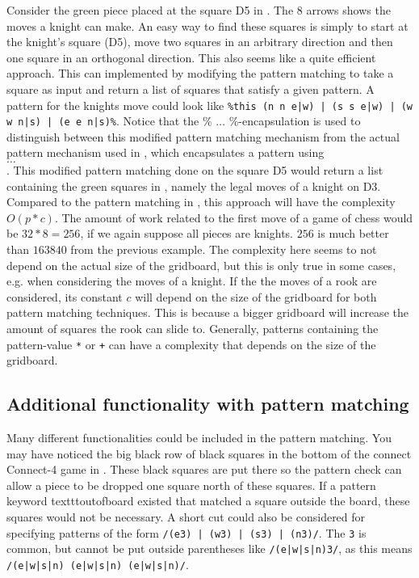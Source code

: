 Consider the green piece placed at the square D5 in . The 8 arrows shows the moves a knight can make. An easy way to find these squares is simply to start at the knight's square (D5), move two squares in an arbitrary direction and then one square in an orthogonal direction. This also seems like a quite efficient approach. This can implemented by modifying the pattern matching to take a square as input and return a list of squares that satisfy a given pattern. A pattern for the knights move could look like \texttt{\%this (n n e|w) | (s s e|w) | (w w n|s) | (e e n|s)\%}. Notice that the \% $\ldots$ \%-encapsulation is used to distinguish between this modified pattern matching mechanism from the actual pattern mechanism used in \productname{}, which encapsulates a pattern using \\ $\ldots$ \\. This modified pattern matching done on the square D5 would return a list containing the green squares in , namely the legal moves of a knight on D3.
Compared to the pattern matching in \productname{}, this approach will have the complexity $O(p * c)$. The amount of work related to the first move of a game of chess would be $32 * 8 = 256$, if we again suppose all pieces are knights. $256$ is much better than $163840$ from the previous example. The complexity here seems to not depend on the actual size of the gridboard, but this is only true in some cases, e.g. when considering the moves of a knight. If the the moves of a rook are considered, its constant $c$ will depend on the size of the gridboard for both pattern matching techniques. This is because a bigger gridboard will increase the amount of squares the rook can slide to. Generally, patterns containing the pattern-value \texttt{*} or \texttt{+} can have a complexity that depends on the size of the gridboard.


\subsection{Additional functionality with pattern matching}
Many different functionalities could be included in the pattern matching. You may have noticed the big black row of black squares in the bottom of the connect Connect-4 game in . These black squares are put there so the pattern check can allow a piece to be dropped one square north of these squares. If a pattern keyword texttt{outofboard} existed that matched a square outside the board, these squares would not be necessary.
A short cut could also be considered for specifying patterns of the form \texttt{/(e3) | (w3) | (s3) | (n3)/}. The \texttt{3} is common, but cannot be put outside parentheses like \texttt{/(e|w|s|n)3/}, as this means \texttt{/(e|w|s|n) (e|w|s|n) (e|w|s|n)/}.